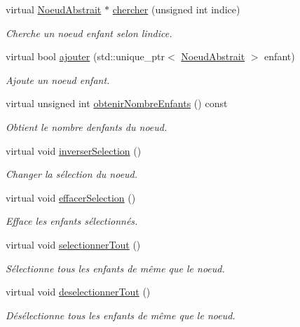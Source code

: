 \begin{DoxyCompactItemize}
virtual \hyperlink{class_noeud_abstrait}{Noeud\+Abstrait} $\ast$ \hyperlink{group__inf2990_ga13f7e9a637f7439b1a0cec0c49f6fa88}{chercher} (unsigned int indice)
\begin{DoxyCompactList}\small\item\em Cherche un noeud enfant selon l\textquotesingle{}indice. \end{DoxyCompactList}\item 
virtual bool \hyperlink{group__inf2990_ga7051399643afa57468ef07444a085a85}{ajouter} (std\+::unique\+\_\+ptr$<$ \hyperlink{class_noeud_abstrait}{Noeud\+Abstrait} $>$ enfant)
\begin{DoxyCompactList}\small\item\em Ajoute un noeud enfant. \end{DoxyCompactList}\item 
virtual unsigned int \hyperlink{group__inf2990_gad5a99959e905fc2d9f0fef16a02546a2}{obtenir\+Nombre\+Enfants} () const 
\begin{DoxyCompactList}\small\item\em Obtient le nombre d\textquotesingle{}enfants du noeud. \end{DoxyCompactList}\item 
virtual void \hyperlink{group__inf2990_ga2516eef94f98d4951baff6fd45020725}{inverser\+Selection} ()
\begin{DoxyCompactList}\small\item\em Changer la sélection du noeud. \end{DoxyCompactList}\item 
virtual void \hyperlink{group__inf2990_gaf6440c1b4ab6861f0ace6ba410c1fc84}{effacer\+Selection} ()
\begin{DoxyCompactList}\small\item\em Efface les enfants sélectionnés. \end{DoxyCompactList}\item 
virtual void \hyperlink{group__inf2990_gaa9b1fa06dad2695ea6870411c62652b3}{selectionner\+Tout} ()
\begin{DoxyCompactList}\small\item\em Sélectionne tous les enfants de même que le noeud. \end{DoxyCompactList}\item 
virtual void \hyperlink{group__inf2990_ga4f942bd122fc3402537ecac737c5248a}{deselectionner\+Tout} ()
\begin{DoxyCompactList}\small\item\em Désélectionne tous les enfants de même que le noeud. \end{DoxyCompactList}\item 

\end{DoxyCompactItemize}

